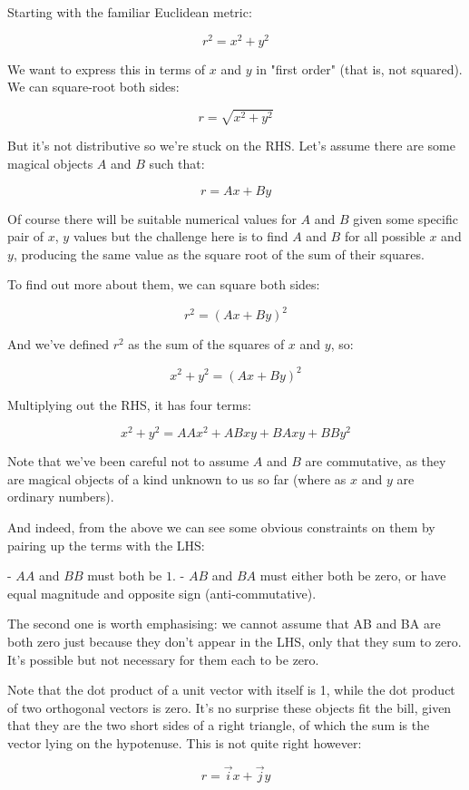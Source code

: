 Starting with the familiar Euclidean metric:

$$r^2 = x^2 + y^2$$

We want to express this in terms of $x$ and $y$ in "first order" (that is, not squared). We can square-root both sides:

$$r = \sqrt{x^2 + y^2}$$

But it's not distributive so we're stuck on the RHS. Let's assume there are some magical objects $A$ and $B$ such that:

$$r = Ax + By$$

Of course there will be suitable numerical values for $A$ and $B$ given some specific pair of $x$, $y$ values but the challenge here is to find $A$ and $B$ for all possible $x$ and $y$, producing the same value as the square root of the sum of their squares.

To find out more about them, we can square both sides:

$$r^2 = (Ax + By)^2$$

And we've defined $r^2$ as the sum of the squares of $x$ and $y$, so:

$$x^2 + y^2 = (Ax + By)^2$$

Multiplying out the RHS, it has four terms:

$$
x^2 + y^2
= AAx^2 + ABxy + BAxy + BBy^2
$$

Note that we've been careful not to assume $A$ and $B$ are commutative, as they are magical objects of a kind unknown to us so far (where as $x$ and $y$ are ordinary numbers).

And indeed, from the above we can see some obvious constraints on them by pairing up the terms with the LHS:

-   $AA$ and $BB$ must both be $1$.
-   $AB$ and $BA$ must either both be zero, or have equal magnitude and opposite sign (anti-commutative).

The second one is worth emphasising: we cannot assume that AB and BA are both zero just because they don't appear in the LHS, only that they sum to zero. It's possible but not necessary for them each to be zero.

Note that the dot product of a unit vector with itself is 1, while the dot product of two orthogonal vectors is zero. It's no surprise these objects fit the bill, given that they are the two short sides of a right triangle, of which the sum is the vector lying on the hypotenuse. This is not quite right however:

$$r = \vec{i}x + \vec{j}y$$

